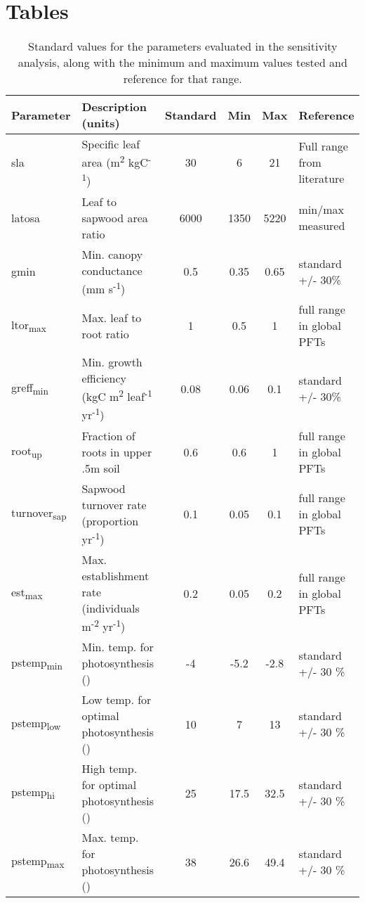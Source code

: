 \documentclass[]{article}
\title{}
\author{}
\begin{document}
	
\section{Tables}

\begin{table}[ht]
	\begin{threeparttable}
		\caption{Standard values for the parameters evaluated in the sensitivity analysis, along with the minimum and maximum values tested and reference for that range.} 
		\begin{tabular}{llcccl}
			\toprule
			Parameter & Description (units) & Standard & Min & Max & Reference \\ 
			\midrule
			sla & Specific leaf area (m\textsuperscript{2} kgC\textsuperscript{-1}) & 30 & 6 & 21 & Full range from literature\tnote1 \\
			latosa & Leaf to sapwood area ratio & 6000 & 1350 & 5220 & min/max measured\tnote2 \\
			gmin & Min. canopy conductance (mm s\textsuperscript{-1}) & 0.5 & 0.35 & 0.65 & standard +/- 30\% \\
			ltor\textsubscript{max} & Max. leaf to root ratio & 1 & 0.5 & 1 & full range in global PFTs \\
			greff\textsubscript{min} & Min. growth efficiency (kgC m\textsuperscript{2} leaf\textsuperscript{-1} yr\textsuperscript{-1}) & 0.08 & 0.06 & 0.1 & standard +/- 30\% \\
			root\textsubscript{up} & Fraction of roots in upper .5m soil & 0.6 & 0.6 & 1 & full range in global PFTs \\
			turnover\textsubscript{sap} & Sapwood turnover rate (proportion yr\textsuperscript{-1}) & 0.1 & 0.05 & 0.1 & full range in global PFTs \\
			est\textsubscript{max} & Max. establishment rate (individuals m\textsuperscript{-2} yr\textsuperscript{-1}) & 0.2 & 0.05 & 0.2 & full range in global PFTs \\
			pstemp\textsubscript{min} & Min. temp. for photosynthesis (\celsius) & -4 & -5.2 & -2.8 & standard +/- 30 \% \\
			pstemp\textsubscript{low} & Low temp. for optimal photosynthesis (\celsius) & 10 & 7 & 13 & standard +/- 30 \% \\
			pstemp\textsubscript{hi} & High temp. for optimal photosynthesis (\celsius) & 25 & 17.5 & 32.5 & standard +/- 30 \% \\
			pstemp\textsubscript{max} & Max. temp. for photosynthesis (\celsius) & 38 & 26.6 & 49.4 & standard +/- 30 \% \\

\end{tabular}
\end{threeparttable}
\end{table}
\end{document}
